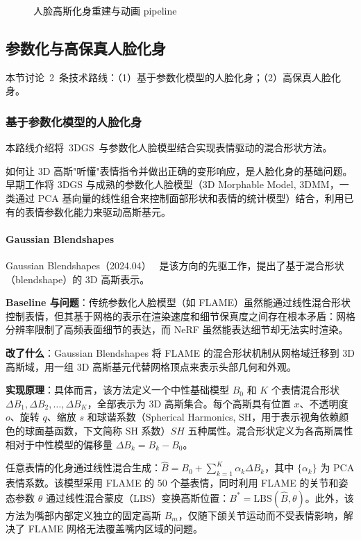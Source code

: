 \begin{figure}[htbp]
\centering
\resizebox{\textwidth}{!}{}
\caption{人脸高斯化身重建与动画 pipeline}
\label{fig:ch16_face_pipeline}
\end{figure}

\subsection{参数化与高保真人脸化身}
\label{ss:16_1a}

本节讨论~2~条技术路线：（1）基于参数化模型的人脸化身；（2）高保真人脸化身。

\subsubsection{基于参数化模型的人脸化身}

本路线介绍将~3DGS~与参数化人脸模型结合实现表情驱动的混合形状方法。

如何让 3D 高斯"听懂"表情指令并做出正确的变形响应，是人脸化身的基础问题。早期工作将 3DGS 与成熟的参数化人脸模型（3D Morphable Model, 3DMM，一类通过 PCA 基向量的线性组合来控制面部形状和表情的统计模型）结合，利用已有的表情参数化能力来驱动高斯基元。

\paragraph{Gaussian Blendshapes}

Gaussian Blendshapes（2024.04）~\cite{2404_19398} 是该方向的先驱工作，提出了基于混合形状（blendshape）的 3D 高斯表示。

\textbf{Baseline 与问题}：传统参数化人脸模型（如 FLAME）虽然能通过线性混合形状控制表情，但其基于网格的表示在渲染速度和细节保真度之间存在根本矛盾：网格分辨率限制了高频表面细节的表达，而 NeRF 虽然能表达细节却无法实时渲染。

\textbf{改了什么}：Gaussian Blendshapes 将 FLAME 的混合形状机制从网格域迁移到 3D 高斯域，用一组 3D 高斯基元代替网格顶点来表示头部几何和外观。

\textbf{实现原理}：具体而言，该方法定义一个中性基础模型 $B_0$ 和 $K$ 个表情混合形状 $\Delta B_1, \Delta B_2, \ldots, \Delta B_K$，全部表示为 3D 高斯集合。每个高斯具有位置 $x$、不透明度 $o$、旋转 $q$、缩放 $s$ 和球谐系数（Spherical Harmonics, SH，用于表示视角依赖颜色的球面基函数，下文简称 SH 系数）$SH$ 五种属性。混合形状定义为各高斯属性相对于中性模型的偏移量 $\Delta B_k = B_k - B_0$。

任意表情的化身通过线性混合生成：$\hat{B} = B_0 + \sum_{k=1}^{K} \alpha_k \Delta B_k$，其中 $\{\alpha_k\}$ 为 PCA 表情系数。该模型采用 FLAME 的 50 个基表情，同时利用 FLAME 的关节和姿态参数 $\theta$ 通过线性混合蒙皮（LBS）变换高斯位置：$B^* = \mathrm{LBS}(\hat{B}, \theta)$。此外，该方法为嘴部内部定义独立的固定高斯 $B_m$，仅随下颌关节运动而不受表情影响，解决了 FLAME 网格无法覆盖嘴内区域的问题。

